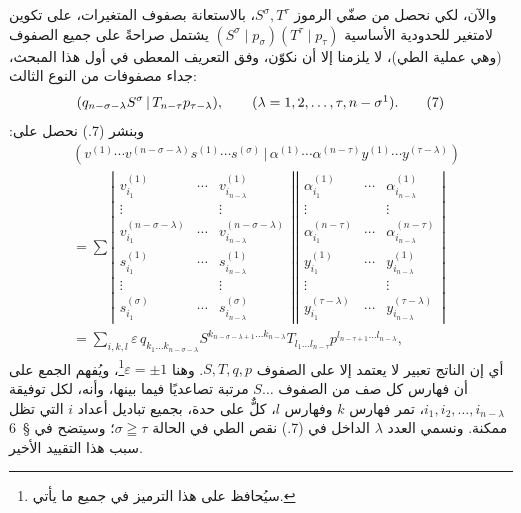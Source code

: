\documentclass[11pt]{article}
\providecommand{\pair}[2]{(#1\,|\,#2)}
\providecommand{\eps}{\varepsilon}
\begin{document}
والآن، لكي نحصل من صفّي الرموز $S^\sigma,T^\tau$، بالاستعانة بصفوف المتغيرات، على تكوين لامتغير للحدودية الأساسية $(S^\sigma\mid p_\sigma)(T^\tau\mid p_\tau)$ يشتمل صراحةً على جميع الصفوف (وهي عملية الطي)، لا يلزمنا إلا أن نكوّن، وفق التعريف المعطى في أول هذا المبحث، جداء مصفوفات من النوع الثالث:
\begin{equation}
 \pair{q_{n-\sigma-\lambda}S^\sigma}{T_{n-\tau}p_{\tau-\lambda}},
 \qquad (\lambda=1,2,\ldots,\tau,n-\sigma\footnotemark).
\tag{7}
\end{equation}
وبنشر (7.) نحصل على:
\begingroup
\setlength{\arraycolsep}{2pt}
\begin{equation}
\begin{aligned}
&\pair{v^{(1)}\cdots v^{(n-\sigma-\lambda)}s^{(1)}\cdots s^{(\sigma)}}
       {\alpha^{(1)}\cdots\alpha^{(n-\tau)}y^{(1)}\cdots y^{(\tau-\lambda)}} \\
&=\sum
\left|\begin{array}{ccc}
 v_{i_1}^{(1)}&\cdots&v_{i_{n-\lambda}}^{(1)}\\
 \vdots&&\vdots\\
 v_{i_1}^{(n-\sigma-\lambda)}&\cdots&v_{i_{n-\lambda}}^{(n-\sigma-\lambda)}\\
 s_{i_1}^{(1)}&\cdots&s_{i_{n-\lambda}}^{(1)}\\
 \vdots&&\vdots\\
 s_{i_1}^{(\sigma)}&\cdots&s_{i_{n-\lambda}}^{(\sigma)}
\end{array}\right|
\left|\begin{array}{ccc}
 \alpha_{i_1}^{(1)}&\cdots&\alpha_{i_{n-\lambda}}^{(1)}\\
 \vdots&&\vdots\\
 \alpha_{i_1}^{(n-\tau)}&\cdots&\alpha_{i_{n-\lambda}}^{(n-\tau)}\\
 y_{i_1}^{(1)}&\cdots&y_{i_{n-\lambda}}^{(1)}\\
 \vdots&&\vdots\\
 y_{i_1}^{(\tau-\lambda)}&\cdots&y_{i_{n-\lambda}}^{(\tau-\lambda)}
\end{array}\right|\\
&=\sum_{i,k,l}\eps\,q_{k_1\ldots k_{n-\sigma-\lambda}}
 S^{k_{n-\sigma-\lambda+1}\ldots k_{n-\lambda}}
 T_{l_1\ldots l_{n-\tau}}
 p^{l_{n-\tau+1}\ldots l_{n-\lambda}},
\end{aligned}
\tag{8}
\end{equation}
\endgroup
أي إن الناتج تعبير لا يعتمد إلا على الصفوف $S,T,q,p$. وهنا $\eps=\pm1$\footnote{سيُحافظ على هذا الترميز في جميع ما يأتي.}، ويُفهم الجمع على أن فهارس كل صف من الصفوف $S\ldots$ مرتبة تصاعديًا فيما بينها، وأنه، لكل توفيقة $i_1,i_2,\ldots,i_{n-\lambda}$، تمر فهارس $k$ وفهارس $l$، كلٌّ على حدة، بجميع تباديل أعداد $i$ التي تظل ممكنة. ونسمي العدد $\lambda$ الداخل في (7.) نقص الطي في الحالة $\sigma\geqq\tau$؛ وسيتضح في \S\ 6 سبب هذا التقييد الأخير.
\end{document}
